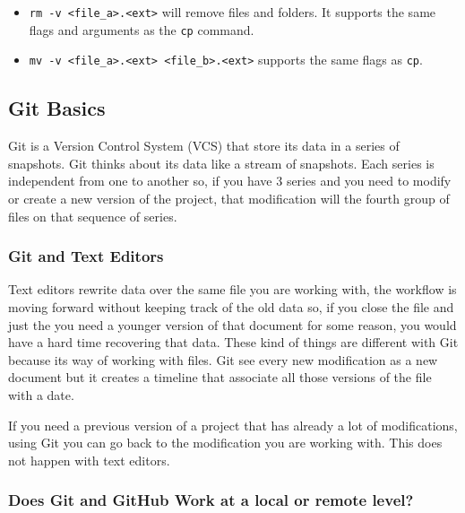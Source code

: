 \documentclass{article}
\begin{document}
\begin{itemize}
    	\item {\tt rm -v <file\_a>.<ext>} will remove files and folders. It supports the same flags and arguments as the {\tt cp} command.
    	
    	\item {\tt mv -v <file\_a>.<ext> <file\_b>.<ext>} supports the same flags as {\tt cp}.
    \end{itemize}


    \subsection{Git Basics}
    
    Git is a Version Control System (VCS) that store its data in a series of snapshots. Git thinks about its data like a stream of snapshots. Each series is independent from one to another so, if you have 3 series and you need to modify or create a new version of the project, that modification will the fourth group of files on that sequence of series. \par
    
    \subsubsection{Git and Text Editors}
	
	
	Text editors rewrite data over the same file you are working with, the workflow is moving forward without keeping track of the old data so, if you close the file and just the you need a younger version of that document for some reason, you would have a hard time recovering that data. These kind of things are different with Git because its way of working with files. Git see every new modification as a new document but it creates a timeline that associate all those versions of the file with a date.\par
	
	If you need a previous version of a project that has already a lot of modifications, using Git you can go back to the modification you are working with. This does not happen with text editors.
	
	\subsubsection{Does Git and GitHub Work at a local or remote level?}
	
\end{document}
